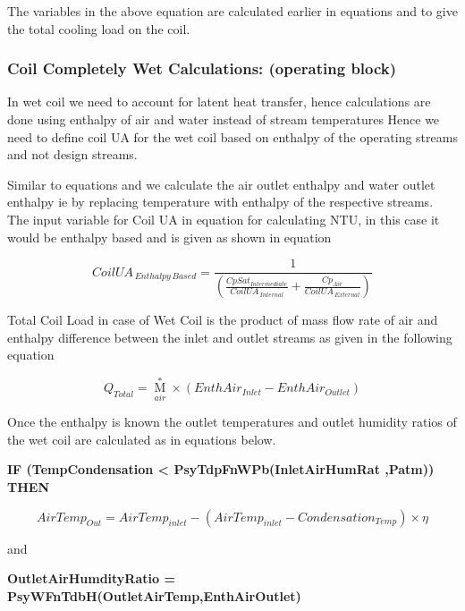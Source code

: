 The variables in the above equation are calculated earlier in equations and to give the total cooling load on the coil.

\subsubsection{Coil Completely Wet Calculations: (operating block)}\label{coil-completely-wet-calculations-operating-block}

In wet coil we need to account for latent heat transfer, hence calculations are done using enthalpy of air and water instead of stream temperatures Hence we need to define coil UA for the wet coil based on enthalpy of the operating streams and not design streams.

Similar to equations and we calculate the air outlet enthalpy and water outlet enthalpy ie by replacing temperature with enthalpy of the respective streams. The input variable for Coil UA in equation for calculating NTU, in this case it would be enthalpy based and is given as shown in equation

\begin{equation}
CoilU{A_{\,Enthalpy\,Based}} = \frac{1}{{\left( {\frac{{CpSa{t_{Intermediate}}}}{{CoilU{A_{\,Internal}}}} + \frac{{C{p_{Air}}}}{{CoilU{A_{\,External}}}}} \right)}}
\end{equation}

Total Coil Load in case of Wet Coil is the product of mass flow rate of air and enthalpy difference between the inlet and outlet streams as given in the following equation

\begin{equation}
{Q_{Total}} = {\mathop M\limits^ *_{air}} \times (EnthAi{r_{Inlet}} - EnthAi{r_{Outlet}})
\end{equation}

Once the enthalpy is known the outlet temperatures and outlet humidity ratios of the wet coil are calculated as in equations below.

\textbf{IF (TempCondensation \textless{} PsyTdpFnWPb(InletAirHumRat ,Patm)) THEN}

\begin{equation}
AirTem{p_{Out}} = AirTem{p_{inlet}} - (AirTem{p_{inlet}} - Condensatio{n_{Temp}}) \times \eta
\end{equation}

and

\textbf{OutletAirHumdityRatio = PsyWFnTdbH(OutletAirTemp,EnthAirOutlet)}

